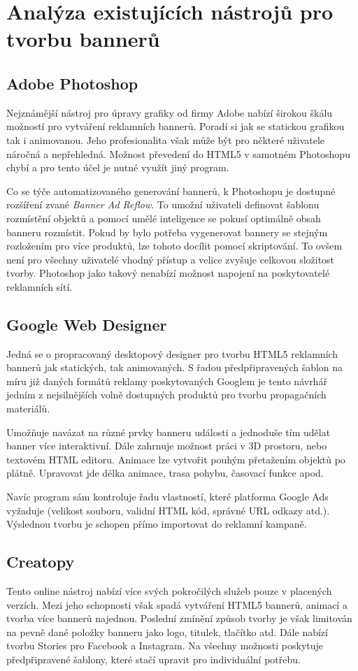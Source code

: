 \chapter{Analýza existujících nástrojů pro tvorbu bannerů}
\label{chap:analysis}

\section{Adobe Photoshop}
Nejznámější nástroj pro úpravy grafiky od firmy Adobe nabízí širokou škálu možností pro vytváření reklamních bannerů.
Poradí si jak se statickou grafikou tak i animovanou. Jeho profesionalita však může být pro některé uživatele náročná a nepřehledná.
Možnost převedení do HTML5 v samotném Photoshopu chybí a pro tento účel je nutné využít jiný program.

Co se týče automatizovaného generování bannerů, k Photoshopu je dostupné rozšíření zvané \emph{Banner Ad Reflow}.
To umožní uživateli definovat šablonu rozmístění objektů a pomocí umělé inteligence se pokusí optimálně obsah banneru rozmístit.
Pokud by bylo potřeba vygenerovat bannery se stejným rozložením pro více produktů, lze tohoto docílit pomocí skriptování.
To ovšem není pro všechny uživatelé vhodný přístup a velice zvyšuje celkovou složitost tvorby. Photoshop jako takový nenabízí možnost napojení na poskytovatelé reklamních sítí.

\section{Google Web Designer}
Jedná se o propracovaný desktopový designer pro tvorbu HTML5 reklamních bannerů jak statických, tak animovaných.
S řadou předpřipravených šablon na míru již daných formátů reklamy poskytovaných Googlem je tento návrhář jedním z nejsilnějších
volně dostupných produktů pro tvorbu propagačních materiálů.

Umožňuje navázat na různé prvky banneru události a jednoduše tím udělat banner více interaktivní.
Dále zahrnuje možnost práci v 3D prostoru, nebo textovém HTML editoru.
Animace lze vytvořit pouhým přetažením objektů po plátně. Upravovat jde délka animace, trasa pohybu, časovací funkce apod. 

Navíc program sám kontroluje řadu vlastností, které platforma Google Ads vyžaduje
(velikost souboru, validní HTML kód, správné URL odkazy atd.). Výslednou tvorbu je schopen přímo importovat do reklamní kampaně.

\section{Creatopy}
Tento online nástroj nabízí více svých pokročilých služeb pouze v placených verzích. Mezi jeho schopnosti však spadá vytváření HTML5 bannerů,
animací a tvorba více bannerů najednou. Poslední zmínění způsob tvorby je však limitován na pevně dané položky banneru jako logo, titulek,
tlačítko atd. Dále nabízí tvorbu Stories pro Facebook a Instagram. Na všechny možnosti poskytuje předpřipravené šablony,
které stačí upravit pro individuální potřebu.

